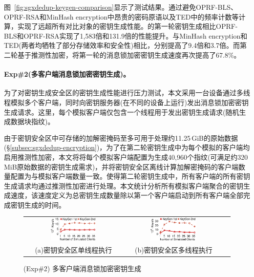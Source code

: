 图~\ref{fig:sgxdedup-keygen-comparison}显示了测试结果。\sysnameS 通过避免OPRF-BLS、OPRF-RSA和MinHash encryption中昂贵的密码原语以及TED中的频率计数等计算，实现了远超所有对比对象的密钥生成性能。\sysnameS 的第一轮密钥生成相比OPRF-BLS和OPRF-RSA实现了1,583倍和131.9倍的性能提升。与MinHash encryption和TED(两者均牺牲了部分存储效率和安全性)相比，分别提高了9.4倍和3.7倍。而第二轮基于推测性加密，\sysnameS 将第一轮的消息锁加密密钥生成速度再次提高了67.8\%。

\paragraph*{Exp\#2(多客户端消息锁加密密钥生成)。}为了对密钥生成安全区的密钥生成性能进行压力测试，本文采用一台设备通过多线程模拟多个客户端，同时向密钥服务器(在不同的设备上运行)发出消息锁加密密钥生成请求。这里，每个模拟客户端仅包含一个线程用于发出密钥生成请求(随机生成数据块指纹)。

由于密钥安全区中可存储的加解密掩码至多可用于处理约11.25\,GiB的原始数据(\S\ref{subsec:sgxdedup-encryption})，为了在第二轮密钥生成中为每个模拟的客户端均启用推测性加密，本文将将每个模拟客户端配置为生成40,960个指纹(可满足约320\,MiB原始数据的密钥生成需求)，并将密钥安全区离线计算加解密掩码的客户端数量配置为与模拟客户端数量一致。使得第二轮密钥生成中，所有客户端的所有密钥生成请求均通过推测性加密进行处理。本文统计分析所有模拟客户端聚合的密钥生成速度，该速度定义为总密钥生成数量除以第一个客户端启动到所有客户端全部完成密钥生成的时间。

\begin{figure}[!htb]
    \small
    \centering
    \begin{tabular}{@{}c@{}c@{}c}
        \includegraphics[width=0.49\textwidth]{pic/sgxdedup/plot/exp_a3/expa3_keyScale_performance_number_singleThread.pdf} & 
        \hspace{5pt}
        \includegraphics[width=0.49\textwidth]{pic/sgxdedup/plot/exp_a3/expa3_keyScale_performance_number_multiThread.pdf}     \\
        \mbox{\small (a)密钥安全区单线程执行}                                                                               & 
        \mbox{\small (b)密钥安全区多线程执行}                                                                                  \\
    \end{tabular}
    \caption{(Exp\#2) 多客户端消息锁加密密钥生成}
    \label{fig:sgxdedup-exp-keygen-scalability}
\end{figure}

